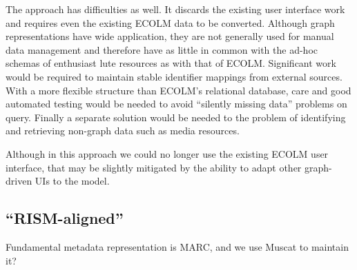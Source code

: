 \documentclass[sigconf]{acmart}
\begin{document}
\begin{sloppypar}
  The approach has difficulties as well. It discards the existing user
  interface work and requires even the existing ECOLM data to be
  converted. Although graph representations have wide application,
  they are not generally used for manual data management and therefore
  have as little in common with the ad-hoc schemas of enthusiast lute
  resources as with that of ECOLM. Significant work would be required
  to maintain stable identifier mappings from external sources. With a
  more flexible structure than ECOLM's relational database, care and
  good automated testing would be needed to avoid ``silently missing
  data'' problems on query. Finally a separate solution would be
  needed to the problem of identifying and retrieving non-graph data
  such as media resources.

  Although in this approach we could no longer use the existing ECOLM
  user interface, that may be slightly mitigated by the ability to
  adapt other graph-driven UIs to the model.
  
  \subsection{``RISM-aligned''}

  Fundamental metadata representation is MARC, and we use Muscat to
  maintain it? 
  
\end{sloppypar}
\end{document}
